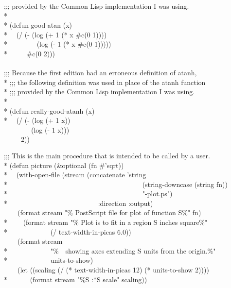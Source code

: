 \begin{new}
\begin{lisp}
;;; provided by the Common Lisp implementation I was using. \\*
\\*
(defun good-atan (x) \\*
~~(/ (- (log (+ 1 (* x \#c(0 1)))) \\*
~~~~~~~~(log (- 1 (* x \#c(0 1))))) \\*
~~~~~\#c(0 2))) \\
\\
;;; Because the first edition had an erroneous definition of atanh, \\*
;;; the following definition was used in place of the atanh function \\*
;;; provided by the Common Lisp implementation I was using. \\*
\\*
(defun really-good-atanh (x) \\*
~~(/ (- (log (+ 1 x)) \\
~~~~~~~~(log (- 1 x))) \\
~~~~~2)) \\
\end{lisp}
\begin{lisp}
;;; This is the main procedure that is intended to be called by a user. \\*
(defun picture (\&optional (fn \#'sqrt)) \\*
~~(with-open-file (stream (concatenate 'string \\*
~~~~~~~~~~~~~~~~~~~~~~~~~~~~~~~~~~~~~~~(string-downcase (string fn)) \\*
~~~~~~~~~~~~~~~~~~~~~~~~~~~~~~~~~~~~~~~"-plot.ps") \\*
~~~~~~~~~~~~~~~~~~~~~~~~~~:direction :output) \\
~~~~(format stream "\% PostScript file for plot of function {\Xtilde}S{\Xtilde}\%" fn) \\*
~~~~(format stream "\% Plot is to fit in a region {\Xtilde}S inches square{\Xtilde}\%" \\*
~~~~~~~~~~~~(/ text-width-in-picas 6.0)) \\
~~~~(format stream \\*
~~~~~~~~~~~~"\%~~showing axes extending {\Xtilde}S units from the origin.{\Xtilde}\%" \\*
~~~~~~~~~~~~units-to-show) \\
~~~~(let ((scaling (/ (* text-width-in-picas 12) (* units-to-show 2)))) \\*
~~~~~~(format stream "{\Xtilde}\%{\Xtilde}S {\Xtilde}:*{\Xtilde}S scale" scaling)) \\

\end{lisp}
\end{new}
